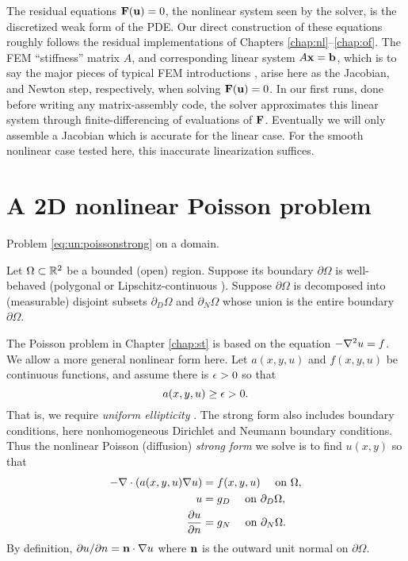 The residual equations $\mathbf{F}(\mathbf{u})=0$, the nonlinear system seen by the \pSNES solver, is the discretized weak form of the PDE.  Our direct construction of these equations roughly follows the residual implementations of Chapters \ref{chap:nl}--\ref{chap:of}.  The FEM ``stiffness'' matrix $A$, and corresponding linear system $A\mathbf{x} = \mathbf{b}$, which is to say the major pieces of typical FEM introductions \citep{Braess2007,Elmanetal2005}, arise here as the Jacobian, and Newton step, respectively, when solving $\mathbf{F}(\mathbf{u})=0$.  In our first runs, done before writing any matrix-assembly code, the \pSNES solver approximates this linear system through finite-differencing of evaluations of $\mathbf{F}$.  Eventually we will only assemble a Jacobian which is accurate for the linear case.  For the smooth nonlinear case tested here, this inaccurate linearization suffices.


\section{A 2D nonlinear Poisson problem}

\begin{marginfigure}

\caption{Problem \eqref{eq:un:poissonstrong} on a domain.}
\label{fig:un:generalpoissondomain}
\end{marginfigure}

Let $\Omega \subset \mathbb{R}^2$ be a bounded (open) region.  Suppose its boundary $\partial\Omega$ is well-behaved (polygonal or Lipschitz-continuous \citep[section 1.2]{Ciarlet2002}).  Suppose $\partial\Omega$ is decomposed into (measurable) disjoint subsets $\partial_D \Omega$ and $\partial_N \Omega$ whose union is the entire boundary $\partial \Omega$.

The Poisson problem in Chapter \ref{chap:st} is based on the equation $- \nabla^2 u = f$.  We allow a more general nonlinear form here.  Let $a(x,y,u)$ and $f(x,y,u)$ be continuous functions, and assume there is $\epsilon>0$ so that
    $$a(x,y,u) \ge \epsilon > 0.$$
That is, we require \emph{uniform ellipticity} \citep{Evans2010}.  The strong form also includes boundary conditions, here nonhomogeneous Dirichlet and Neumann boundary conditions.  Thus the  nonlinear Poisson (diffusion) \emph{strong form} we solve is to find $u(x,y)$ so that
\begin{align}
- \nabla\cdot \left(a(x,y,u) \nabla u\right) &= f(x,y,u) \quad \text{ on } \Omega, \label{eq:un:poissonstrong} \\
u &= g_D \quad \text{ on } \partial_D \Omega, \notag \\
\frac{\partial u}{\partial n} &= g_N \quad \text{ on } \partial_N \Omega. \notag
\end{align}
By definition, $\partial u/\partial n = \mathbf{n} \cdot \nabla u$ where $\mathbf{n}$ is the outward unit normal on $\partial \Omega$.

